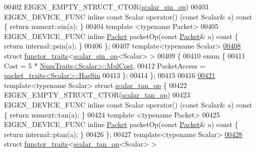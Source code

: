 \begin{DoxyCode}
00402   EIGEN\_EMPTY\_STRUCT\_CTOR(\hyperlink{struct_eigen_1_1internal_1_1scalar__sin__op}{scalar\_sin\_op})
00403   EIGEN\_DEVICE\_FUNC \textcolor{keyword}{inline} \textcolor{keyword}{const} Scalar operator() (\textcolor{keyword}{const} Scalar& a)\textcolor{keyword}{ const }\{ \textcolor{keywordflow}{return} numext::sin(a); \}
00404   \textcolor{keyword}{template} <\textcolor{keyword}{typename} Packet>
00405   EIGEN\_DEVICE\_FUNC \textcolor{keyword}{inline} \hyperlink{union_eigen_1_1internal_1_1_packet}{Packet} packetOp(\textcolor{keyword}{const} \hyperlink{union_eigen_1_1internal_1_1_packet}{Packet}& a)\textcolor{keyword}{ const }\{ \textcolor{keywordflow}{return} internal::psin(a); \}
00406 \};
00407 \textcolor{keyword}{template}<\textcolor{keyword}{typename} Scalar>
\hyperlink{struct_eigen_1_1internal_1_1functor__traits_3_01scalar__sin__op_3_01_scalar_01_4_01_4}{00408} \textcolor{keyword}{struct }\hyperlink{struct_eigen_1_1internal_1_1functor__traits}{functor\_traits}<\hyperlink{struct_eigen_1_1internal_1_1scalar__sin__op}{scalar\_sin\_op}<Scalar> >
00409 \{
00410   \textcolor{keyword}{enum} \{
00411     Cost = 5 * \hyperlink{group___core___module_struct_eigen_1_1_num_traits}{NumTraits<Scalar>::MulCost},
00412     PacketAccess = \hyperlink{struct_eigen_1_1internal_1_1packet__traits}{packet\_traits<Scalar>::HasSin}
00413   \};
00414 \};
00415 
00416 
\hyperlink{struct_eigen_1_1internal_1_1scalar__tan__op}{00421} \textcolor{keyword}{template}<\textcolor{keyword}{typename} Scalar> \textcolor{keyword}{struct }\hyperlink{struct_eigen_1_1internal_1_1scalar__tan__op}{scalar\_tan\_op} \{
00422   EIGEN\_EMPTY\_STRUCT\_CTOR(\hyperlink{struct_eigen_1_1internal_1_1scalar__tan__op}{scalar\_tan\_op})
00423   EIGEN\_DEVICE\_FUNC \textcolor{keyword}{inline} \textcolor{keyword}{const} Scalar operator() (\textcolor{keyword}{const} Scalar& a)\textcolor{keyword}{ const }\{ \textcolor{keywordflow}{return} numext::tan(a); \}
00424   \textcolor{keyword}{template} <\textcolor{keyword}{typename} Packet>
00425   EIGEN\_DEVICE\_FUNC \textcolor{keyword}{inline} \hyperlink{union_eigen_1_1internal_1_1_packet}{Packet} packetOp(\textcolor{keyword}{const} \hyperlink{union_eigen_1_1internal_1_1_packet}{Packet}& a)\textcolor{keyword}{ const }\{ \textcolor{keywordflow}{return} internal::ptan(a); \}
00426 \};
00427 \textcolor{keyword}{template}<\textcolor{keyword}{typename} Scalar>
\hyperlink{struct_eigen_1_1internal_1_1functor__traits_3_01scalar__tan__op_3_01_scalar_01_4_01_4}{00428} \textcolor{keyword}{struct }\hyperlink{struct_eigen_1_1internal_1_1functor__traits}{functor\_traits}<\hyperlink{struct_eigen_1_1internal_1_1scalar__tan__op}{scalar\_tan\_op}<Scalar> >

\end{DoxyCode}
